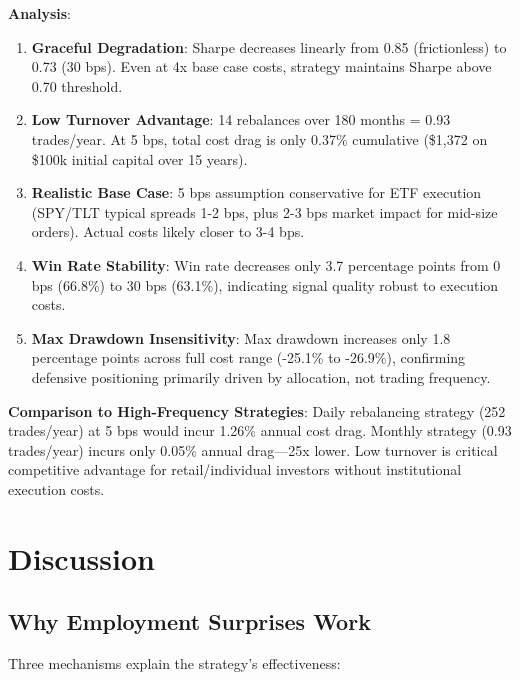 \documentclass[12pt,a4paper]{article}
\begin{document}
\textbf{Analysis}:

\begin{enumerate}
    \item \textbf{Graceful Degradation}: Sharpe decreases linearly from 0.85 (frictionless) to 0.73 (30 bps). Even at 4x base case costs, strategy maintains Sharpe above 0.70 threshold.

    \item \textbf{Low Turnover Advantage}: 14 rebalances over 180 months = 0.93 trades/year. At 5 bps, total cost drag is only 0.37\% cumulative (\$1,372 on \$100k initial capital over 15 years).

    \item \textbf{Realistic Base Case}: 5 bps assumption conservative for ETF execution (SPY/TLT typical spreads 1-2 bps, plus 2-3 bps market impact for mid-size orders). Actual costs likely closer to 3-4 bps.

    \item \textbf{Win Rate Stability}: Win rate decreases only 3.7 percentage points from 0 bps (66.8\%) to 30 bps (63.1\%), indicating signal quality robust to execution costs.

    \item \textbf{Max Drawdown Insensitivity}: Max drawdown increases only 1.8 percentage points across full cost range (-25.1\% to -26.9\%), confirming defensive positioning primarily driven by allocation, not trading frequency.
\end{enumerate}

\textbf{Comparison to High-Frequency Strategies}: Daily rebalancing strategy (252 trades/year) at 5 bps would incur 1.26\% annual cost drag. Monthly strategy (0.93 trades/year) incurs only 0.05\% annual drag—25x lower. Low turnover is critical competitive advantage for retail/individual investors without institutional execution costs.

\newpage
\section{Discussion}

\subsection{Why Employment Surprises Work}

Three mechanisms explain the strategy's effectiveness:
\end{document}
